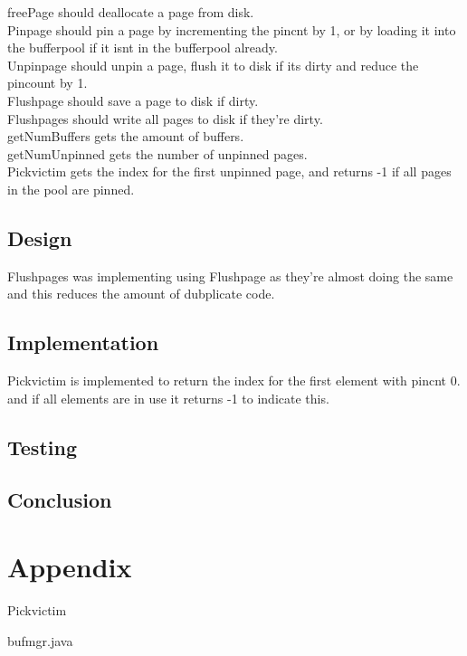 \documentclass[a4paper,10pt,titlepage]{report}
\begin{document}
freePage should deallocate a page from disk.\\

Pinpage should pin a page by incrementing the pincnt by 1, or by loading it into the bufferpool if it isnt in the bufferpool already.\\

Unpinpage should unpin a page, flush it to disk if its dirty and reduce the pincount by 1.\\

Flushpage should save a page to disk if dirty.\\

Flushpages should write all pages to disk if they're dirty.\\

getNumBuffers gets the amount of buffers.\\

getNumUnpinned gets the number of unpinned pages.\\

Pickvictim gets the index for the first unpinned page, and returns -1 if all pages in the pool are pinned.

\subsection{Design}

Flushpages was implementing using Flushpage as they're almost doing the same and this reduces the amount of dubplicate code. 

\subsection{Implementation}

Pickvictim is implemented to return the index for the first element with pincnt 0. and if all elements are in use it returns -1 to indicate this.


\subsection{Testing}

\subsection{Conclusion}



\section{Appendix}
Pickvictim


bufmgr.java

\end{document}
